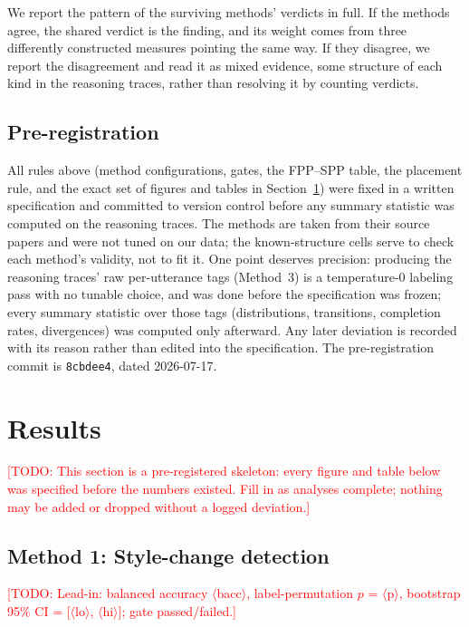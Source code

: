 \documentclass[11pt]{article}
\newcommand{\todo}[1]{\textcolor{red}{[TODO: #1]}}
\newcommand{\resultnum}[1]{\textcolor{red}{$\langle$#1$\rangle$}}
\begin{document}
We report the pattern of the surviving methods' verdicts in full. If the
methods agree, the shared verdict is the finding, and its weight comes from
three differently constructed measures pointing the same way. If they
disagree, we report the disagreement and read it as mixed evidence, some
structure of each kind in the reasoning traces, rather than resolving it by
counting verdicts.

\subsection{Pre-registration}
\label{sec:prereg}

All rules above (method configurations, gates, the FPP--SPP table, the
placement rule, and the exact set of figures and tables in
Section~\ref{sec:results}) were fixed in a written specification and
committed to version control before any summary statistic was computed on the
reasoning traces. The methods are taken from their source papers and were not
tuned on our data; the known-structure cells serve to check each method's
validity, not to fit it. One point deserves precision: producing the reasoning
traces' raw per-utterance tags (Method~3) is a temperature-0 labeling pass
with no tunable choice, and was done before the specification was frozen;
every summary statistic over those tags (distributions, transitions,
completion rates, divergences) was computed only afterward. Any later
deviation is recorded with its reason rather than edited into the
specification. The pre-registration commit is \texttt{8cbdee4}, dated
2026-07-17.

\section{Results}
\label{sec:results}

\todo{This section is a pre-registered skeleton: every figure and table below
was specified before the numbers existed. Fill in as analyses complete;
nothing may be added or dropped without a logged deviation.}

\subsection{Method 1: Style-change detection}
\label{sec:results-m1}

\todo{Lead-in: balanced accuracy \resultnum{bacc}, label-permutation $p$ =
\resultnum{p}, bootstrap 95\% CI = [\resultnum{lo}, \resultnum{hi}]; gate passed/failed.}
\end{document}
